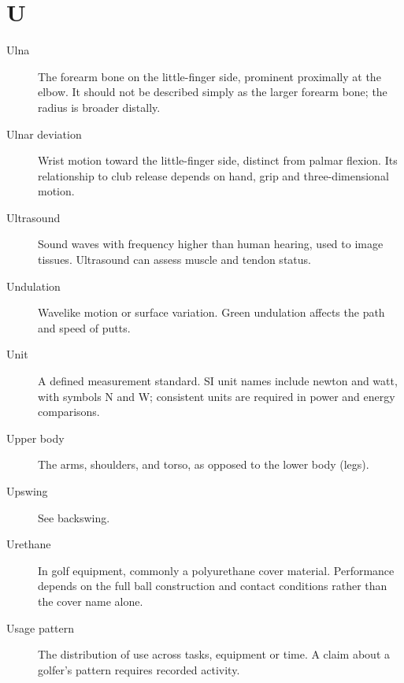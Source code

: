 \section*{U}
\begin{description}

\item[Ulna] The forearm bone on the little-finger side, prominent proximally at the elbow. It should not be described simply as the larger forearm bone; the radius is broader distally.

\item[Ulnar deviation] Wrist motion toward the little-finger side, distinct from palmar flexion. Its relationship to club release depends on hand, grip and three-dimensional motion.

\item[Ultrasound] Sound waves with frequency higher than human hearing, used to image tissues. Ultrasound can assess muscle and tendon status.

\item[Undulation] Wavelike motion or surface variation. Green undulation affects the path and speed of putts.

\item[Unit] A defined measurement standard. SI unit names include newton and watt, with symbols N and W; consistent units are required in power and energy comparisons.

\item[Upper body] The arms, shoulders, and torso, as opposed to the lower body (legs).

\item[Upswing] See backswing.

\item[Urethane] In golf equipment, commonly a polyurethane cover material. Performance depends on the full ball construction and contact conditions rather than the cover name alone.

\item[Usage pattern] The distribution of use across tasks, equipment or time. A claim about a golfer's pattern requires recorded activity.

\end{description}

